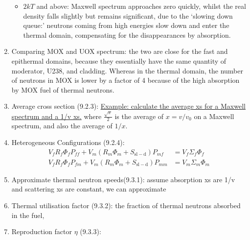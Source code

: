 \documentclass{school-22.211-notes}
\begin{document}
\begin{enumerate}
\begin{itemize}
    \item $2kT$ and above: Maxwell spectrum approaches zero quickly, whilst the real density falls slightly but remains significant, due to the `slowing down queue:' neutrons coming from high energies slow down and enter the thermal domain, compensating for the disappearances by absorption. 
  \end{itemize}
\item Comparing MOX and UOX spectrum: the two are close for the fast and epithermal domains, because they essentially have the same quantity of moderator, U238, and cladding. Whereas in the thermal domain, the number of neutrons in MOX is lower by a factor of 4 because of the high absorption by MOX fuel of thermal neutrons. 
\item Average cross section (9.2.3): 
  \uline{Example: calculate the average xs for a Maxwell spectrum and a 1/v xs.} 
  where $\frac{\sqrt{\pi}}{2}$ is the average of $x = v/v_0$ on a Maxwell spectrum, and also the average of $1/x$. 
\item Heterogeneous Configurations (9.2.4):
  \begin{align}
    V_f R_f \Phi_f P_{ff} + V_m (R_m \Phi_m + S_{\mathrm{sl-d}} ) P_{mf} &= V_f \Sigma_f \Phi_f \\
    V_fR_f \Phi_f P_{fm} + V_m(R_m \Phi_m + S_{\mathrm{sl-d}}) P_{mm} &= V_m \Sigma_m \Phi_m 
  \end{align}
\item Approximate thermal neutron speeds(9.3.1): assume absorption xs are 1/v and scattering xs are constant, we can approximate
\item Thermal utilisation factor (9.3.2): the fraction of thermal neutrons absorbed in the fuel,
\item Reproduction factor $\eta$ (9.3.3):
\end{enumerate}
\end{document}
